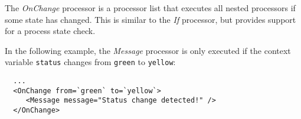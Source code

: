 
The \emph{OnChange} processor is a processor list that executes all
nested processors if some state has changed. This is similar to the
\emph{If} processor, but provides support for a process state check.

In the following example, the \emph{Message} processor is only executed
if the context variable \texttt{status} changes from \texttt{green} to
\texttt{yellow}:

\begin{verbatim}
  ...
  <OnChange from=`green` to=`yellow`>
     <Message message="Status change detected!" />
  </OnChange>
\end{verbatim}


\begin{table}[h]
\end{table}
